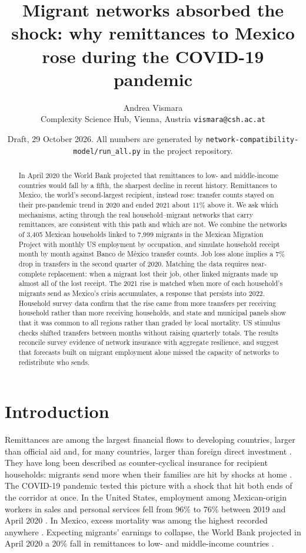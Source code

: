 \documentclass[11pt]{article}
\title{Migrant networks absorbed the shock: why remittances to Mexico rose during the COVID-19 pandemic}
\author{Andrea Vismara\\[2pt]\small Complexity Science Hub, Vienna, Austria \quad \texttt{vismara@csh.ac.at}}
\date{\small Draft, 29 October 2026. All numbers are generated by \texttt{network-compatibility-model/run\_all.py} in the project repository.}
\begin{document}
\maketitle

\begin{abstract}
\noindent
In April 2020 the World Bank projected that remittances to low- and middle-income countries would fall by a fifth, the sharpest decline in recent history. Remittances to Mexico, the world's second-largest recipient, instead rose: transfer counts stayed on their pre-pandemic trend in 2020 and ended 2021 about 11\% above it. We ask which mechanisms, acting through the real household--migrant networks that carry remittances, are consistent with this path and which are not. We combine the networks of 3,405 Mexican households linked to 7,999 migrants in the Mexican Migration Project with monthly US employment by occupation, and simulate household receipt month by month against Banco de M\'exico transfer counts. Job loss alone implies a 7\% drop in transfers in the second quarter of 2020. Matching the data requires near-complete replacement: when a migrant lost their job, other linked migrants made up almost all of the lost receipt. The 2021 rise is matched when more of each household's migrants send as Mexico's crisis accumulates, a response that persists into 2022. Household survey data confirm that the rise came from more transfers per receiving household rather than more receiving households, and state and municipal panels show that it was common to all regions rather than graded by local mortality. US stimulus checks shifted transfers between months without raising quarterly totals. The results reconcile survey evidence of network insurance with aggregate resilience, and suggest that forecasts built on migrant employment alone missed the capacity of networks to redistribute who sends.
\end{abstract}

\section{Introduction}

Remittances are among the largest financial flows to developing countries, larger than official aid and, for many countries, larger than foreign direct investment \citep{yang2011}. They have long been described as counter-cyclical insurance for recipient households: migrants send more when their families are hit by shocks at home \citep{lucasstark1985,yangchoi2007,bettin2017}. The COVID-19 pandemic tested this picture with a shock that hit both ends of the corridor at once. In the United States, employment among Mexican-origin workers in sales and personal services fell from 96\% to 76\% between 2019 and April 2020 \citep{ipumscps,borjascassidy2020}. In Mexico, excess mortality was among the highest recorded anywhere \citep{karlinsky2021}. Expecting migrants' earnings to collapse, the World Bank projected in April 2020 a 20\% fall in remittances to low- and middle-income countries \citep{worldbank2020brief32}.
\end{document}
